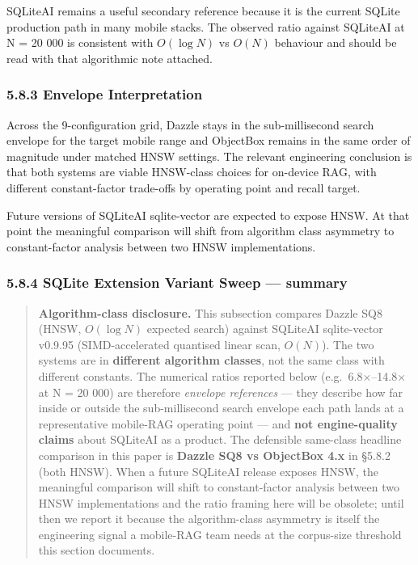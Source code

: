 SQLiteAI remains a useful secondary reference because it is the current SQLite
production path in many mobile stacks. The observed ratio against SQLiteAI at N
= 20 000 is consistent with \(O(\log N)\) vs \(O(N)\) behaviour and should be
read with that algorithmic note attached.

\subsubsection{5.8.3 Envelope Interpretation}\label{envelope-interpretation}

Across the 9-configuration grid, Dazzle stays in the sub-millisecond search
envelope for the target mobile range and ObjectBox remains in the same order of
magnitude under matched HNSW settings. The relevant engineering conclusion is
that both systems are viable HNSW-class choices for on-device RAG, with
different constant-factor trade-offs by operating point and recall target.

Future versions of SQLiteAI sqlite-vector are expected to expose HNSW. At that
point the meaningful comparison will shift from algorithm class asymmetry to
constant-factor analysis between two HNSW implementations.

\subsubsection{5.8.4 SQLite Extension Variant Sweep ---
summary}\label{sqlite-extension-variant-sweep-summary}

\begin{quote}
\textbf{Algorithm-class disclosure.} This subsection compares Dazzle SQ8 (HNSW,
\(O(\log N)\) expected search) against SQLiteAI sqlite-vector v0.9.95
(SIMD-accelerated quantised linear scan, \(O(N)\)). The two systems are in
\textbf{different algorithm classes}, not the same class with different
constants. The numerical ratios reported below (e.g.~6.8×--14.8× at N = 20 000)
are therefore \emph{envelope references} --- they describe how far inside or
outside the sub-millisecond search envelope each path lands at a representative
mobile-RAG operating point --- and \textbf{not engine-quality claims} about
SQLiteAI as a product. The defensible same-class headline comparison in this
paper is \textbf{Dazzle SQ8 vs ObjectBox 4.x} in §5.8.2 (both HNSW). When a
future SQLiteAI release exposes HNSW, the meaningful comparison will shift to
constant-factor analysis between two HNSW implementations and the ratio framing
here will be obsolete; until then we report it because the algorithm-class
asymmetry is itself the engineering signal a mobile-RAG team needs at the
corpus-size threshold this section documents.
\end{quote}

